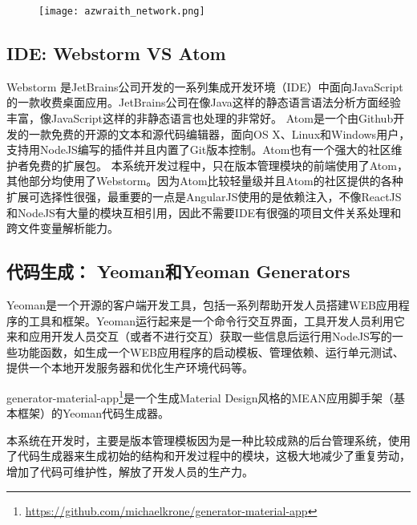 \begin{figure}[!htp]
 \centering
 \texttt{[image: azwraith\_network.png]}
\end{figure}

\subsection{IDE: Webstorm VS Atom}
Webstorm 是JetBrains公司开发的一系列集成开发环境（IDE）中面向JavaScript的一款收费桌面应用。JetBrains公司在像Java这样的静态语言语法分析方面经验丰富，像JavaScript这样的非静态语言也处理的非常好。
Atom是一个由Github开发的一款免费的开源的文本和源代码编辑器，面向OS X、Linux和Windows用户，支持用NodeJS编写的插件并且内置了Git版本控制。Atom也有一个强大的社区维护者免费的扩展包。
本系统开发过程中，只在版本管理模块的前端使用了Atom，其他部分均使用了Webstorm。因为Atom比较轻量级并且Atom的社区提供的各种扩展可选择性很强，最重要的一点是AngularJS使用的是依赖注入，不像ReactJS和NodeJS有大量的模块互相引用，因此不需要IDE有很强的项目文件关系处理和跨文件变量解析能力。

\subsection{代码生成： Yeoman和Yeoman Generators}
Yeoman是一个开源的客户端开发工具，包括一系列帮助开发人员搭建WEB应用程序的工具和框架。Yeoman运行起来是一个命令行交互界面，工具开发人员利用它来和应用开发人员交互（或者不进行交互）获取一些信息后运行用NodeJS写的一些功能函数，如生成一个WEB应用程序的启动模板、管理依赖、运行单元测试、提供一个本地开发服务器和优化生产环境代码等。

generator-material-app\footnote{\url{https://github.com/michaelkrone/generator-material-app}}是一个生成Material Design风格的MEAN应用脚手架（基本框架）的Yeoman代码生成器。

本系统在开发时，主要是版本管理模板因为是一种比较成熟的后台管理系统，使用了代码生成器来生成初始的结构和开发过程中的模块，这极大地减少了重复劳动，增加了代码可维护性，解放了开发人员的生产力。


